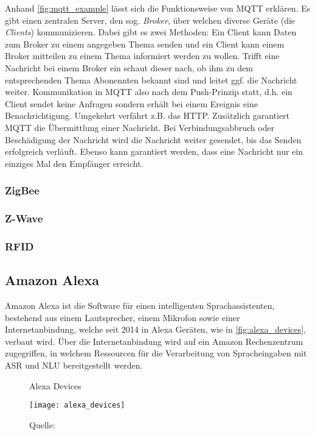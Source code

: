 Anhand \autoref{fig:mqtt_example} lässt sich die Funktionsweise von \ac{MQTT} erklären.
Es gibt einen zentralen Server, den sog. \textit{Broker}, über welchen diverse Geräte (die \textit{Clients}) kommunizieren.
Dabei gibt es zwei Methoden:
Ein Client kann Daten zum Broker zu einem angegeben Thema senden und ein Client kann einem Broker mitteilen zu einem Thema informiert werden zu wollen.
Trifft eine Nachricht bei einem Broker ein schaut dieser nach, ob ihm zu dem entsprechenden Thema Abonennten bekannt sind und leitet ggf. die Nachricht weiter.
Kommunikation in \ac{MQTT} also nach dem Push-Prinzip statt, d.h. ein Client sendet keine Anfragen sondern erhält bei einem Ereignis eine Benachrichtigung.
Umgekehrt verfährt z.B. das \ac{HTTP}.
Zusätzlich garantiert \ac{MQTT} die Übermittlung einer Nachricht.
Bei Verbindungsabbruch oder Beschädigung der Nachricht wird die Nachricht weiter gesendet, bis das Senden erfolgreich verläuft.
Ebenso kann garantiert werden, dass eine Nachricht nur ein einziges Mal den Empfänger erreicht.



\subsubsection{ZigBee}
\subsubsection{Z-Wave}
\subsubsection{RFID}

\subsection{Amazon Alexa}

Amazon Alexa ist die Software für einen intelligenten Sprachassistenten, bestehend aus einem Lautsprecher, einem Mikrofon sowie einer Internetanbindung, welche seit 2014 in Alexa Geräten, wie in \autoref{fig:alexa_devices}, verbaut wird.
Über die Internetanbindung wird auf ein Amazon Rechenzentrum zugegriffen, in welchem Ressourcen für die Verarbeitung von Spracheingaben mit \ac{ASR} und \ac{NLU} bereitgestellt werden.

\begin{figure}[ht]
	\centering
	\caption{Alexa Devices}
	\texttt{[image: alexa\_devices]}
	\caption*{\footnotesize{Quelle: }}
	\label{fig:alexa_devices}
\end{figure}

